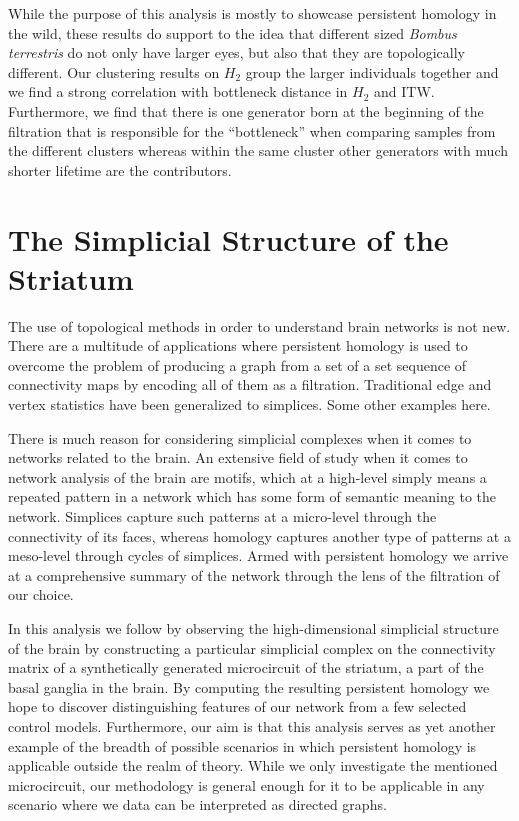 

While the purpose of this analysis is mostly to showcase persistent homology in the wild, these results  do support to the idea that different sized \textit{Bombus terrestris} do not only have larger eyes, but also that they are topologically different. Our clustering results on $H_{2}$ group the larger individuals together and we find a strong correlation with bottleneck distance in $H_{2}$ and ITW. Furthermore, we find that there is one generator born at the beginning of the filtration that is responsible for the ``bottleneck'' when comparing samples from the different clusters whereas within the same cluster other generators with much shorter lifetime are the contributors.
\clearpage
\section{The Simplicial Structure of the Striatum}
The use of topological methods in order to understand brain networks is not new. There are a multitude of applications where persistent homology is used to overcome the problem of producing a graph from a set of a set sequence of connectivity maps by encoding all of them as a filtration. Traditional edge and vertex statistics have been generalized to simplices. Some other examples here.

There is much reason for considering simplicial complexes when it comes to networks related to the brain. An extensive field of study when it comes to network analysis of the brain are motifs, which at a high-level simply means a repeated pattern in a network which has some form of semantic meaning to the network. Simplices capture such patterns at a micro-level through the connectivity of its faces, whereas homology captures another type of patterns at a meso-level through cycles of simplices. Armed with persistent homology we arrive at a comprehensive summary of the network through the lens of the filtration of our choice.

In this analysis we follow \cite{reimann} by observing the high-dimensional simplicial structure of the brain by constructing a particular simplicial complex on the connectivity matrix of a synthetically generated microcircuit of the striatum, a part of the basal ganglia in the brain. By computing the resulting persistent homology we hope to discover distinguishing features of our network from a few selected control models. Furthermore, our aim is that this analysis serves as yet another example of the breadth of possible scenarios in which persistent homology is applicable outside the realm of theory. While we only investigate the mentioned microcircuit, our methodology is general enough for it to be applicable in any scenario where we data can be interpreted as directed graphs.

